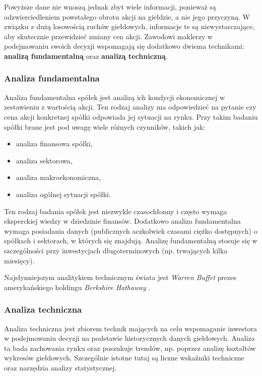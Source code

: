 \documentclass[a4paper, twoside, 11pt, openright]{article}
\begin{document}
\bigskip

Powyższe dane nie wnoszą jednak zbyt wiele informacji, ponieważ są odzwierciedleniem powstałego obrotu akcji na giełdzie, a nie jego przyczyną. W związku z dużą losowością ruchów giełdowych, informacje te są niewystarczające, aby skutecznie przewidzieć zmiany cen akcji. Zawodowi maklerzy w podejmowaniu swoich decyzji wspomagają się dodatkowo dwiema technikami: \textbf{analizą fundamentalną} oraz \textbf{analizą techniczną}.

\subsubsection{Analiza fundamentalna}

Analiza fundamentalna \cite{fundamentalanalysis} spółek jest analizą ich kondycji ekonomicznej w zestawieniu z wartością akcji. Ten rodzaj analizy ma odpowiedzieć na pytanie czy cena akcji konkretnej spółki odpowiada jej sytuacji na rynku. Przy takim badaniu spółki brane jest pod uwagę wiele różnych czynników, takich jak:
\begin{itemize}
\item{analiza finansowa spółki},
\item{analiza sektorowa},
\item{analiza makroekonomiczna},
\item{analiza ogólnej sytuacji spółki}.
\end{itemize}

Ten rodzaj badania spółek jest niezwykle czasochłonny i często wymaga eksperckiej wiedzy w dziedzinie finansów. Dodatkowo analiza fundamentalna wymaga posiadania danych (publicznych aczkolwiek czasami ciężko dostępnych) o spółkach i sektorach, w których się znajdują. Analizę fundamentalną stosuje się w szczególności przy inwestycjach długoterminowych (np. trwających kilka miesięcy).

Najsłynniejszym analitykiem technicznym świata jest \textit{Warren Buffet} prezes amerykańskiego holdingu \textit{Berkshire Hathaway \cite{berkeshire}}. 

\subsubsection{Analiza techniczna}

Analiza techniczna \cite{technicalanalysis} jest zbiorem technik mających na celu wspomaganie inwestora w podejmowaniu decyzji na podstawie historycznych danych giełdowych. Analiza ta bada zachowania rynku oraz poszukuje trendów, np. poprzez analizę kształtów wykresów giełdowych. Szczególnie istotne tutaj są liczne wskaźniki techniczne oraz narzędzia analizy statystycznej.
\end{document}
